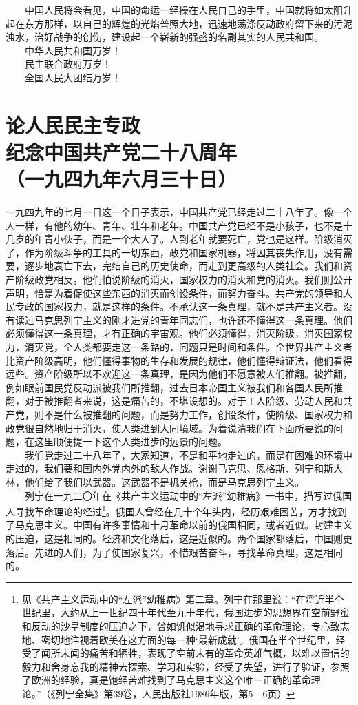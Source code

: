 \documentclass[cn,11pt,chinese]{elegantbook}
\def\myformat#1{\hfil\hfil #1}
\begin{document}
　　中国人民将会看见，中国的命运一经操在人民自己的手里，中国就将如太阳升起在东方那样，以自己的辉煌的光焰普照大地，迅速地荡涤反动政府留下来的污泥浊水，治好战争的创伤，建设起一个崭新的强盛的名副其实的人民共和国。\\
　　中华人民共和国万岁！\\
　　民主联合政府万岁！\\
　　全国人民大团结万岁！\\
\newpage\section*{\myformat{论人民民主专政}\\\myformat{纪念中国共产党二十八周年}\\\myformat{（一九四九年六月三十日）}}
一九四九年的七月一日这一个日子表示，中国共产党已经走过二十八年了。像一个人一样，有他的幼年、青年、壮年和老年。中国共产党已经不是小孩子，也不是十几岁的年青小伙子，而是一个大人了。人到老年就要死亡，党也是这样。阶级消灭了，作为阶级斗争的工具的一切东西，政党和国家机器，将因其丧失作用，没有需要，逐步地衰亡下去，完结自己的历史使命，而走到更高级的人类社会。我们和资产阶级政党相反。他们怕说阶级的消灭，国家权力的消灭和党的消灭。我们则公开声明，恰是为着促使这些东西的消灭而创设条件，而努力奋斗。共产党的领导和人民专政的国家权力，就是这样的条件。不承认这一条真理，就不是共产主义者。没有读过马克思列宁主义的刚才进党的青年同志们，也许还不懂得这一条真理。他们必须懂得这一条真理，才有正确的宇宙观。他们必须懂得，消灭阶级，消灭国家权力，消灭党，全人类都要走这一条路的，问题只是时间和条件。全世界共产主义者比资产阶级高明，他们懂得事物的生存和发展的规律，他们懂得辩证法，他们看得远些。资产阶级所以不欢迎这一条真理，是因为他们不愿意被人们推翻。被推翻，例如眼前国民党反动派被我们所推翻，过去日本帝国主义被我们和各国人民所推翻，对于被推翻者来说，这是痛苦的，不堪设想的。对于工人阶级、劳动人民和共产党，则不是什么被推翻的问题，而是努力工作，创设条件，使阶级、国家权力和政党很自然地归于消灭，使人类进到大同境域。为着说清我们在下面所要说的问题，在这里顺便提一下这个人类进步的远景的问题。\\
　　我们党走过二十八年了，大家知道，不是和平地走过的，而是在困难的环境中走过的，我们要和国内外党内外的敌人作战。谢谢马克思、恩格斯、列宁和斯大林，他们给了我们以武器。这武器不是机关枪，而是马克思列宁主义。\\
　　列宁在一九二〇年在《共产主义运动中的“左派”幼稚病》一书中，描写过俄国人寻找革命理论的经过\footnote[1]{ 见《共产主义运动中的“左派”幼稚病》第二章。列宁在那里说：“在将近半个世纪里，大约从上一世纪四十年代至九十年代，俄国进步的思想界在空前野蛮和反动的沙皇制度的压迫之下，曾如饥似渴地寻求正确的革命理论，专心致志地、密切地注视着欧美在这方面的每一种‘最新成就’。俄国在半个世纪里，经受了闻所未闻的痛苦和牺牲，表现了空前未有的革命英雄气概，以难以置信的毅力和舍身忘我的精神去探索、学习和实验，经受了失望，进行了验证，参照了欧洲的经验，真是饱经苦难找到了马克思主义这个唯一正确的革命理论。”（《列宁全集》第39卷，人民出版社1986年版，第5—6页）}。俄国人曾经在几十个年头内，经历艰难困苦，方才找到了马克思主义。中国有许多事情和十月革命以前的俄国相同，或者近似。封建主义的压迫，这是相同的。经济和文化落后，这是近似的。两个国家都落后，中国则更落后。先进的人们，为了使国家复兴，不惜艰苦奋斗，寻找革命真理，这是相同的。\\
\end{document}

